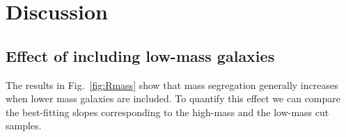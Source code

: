 \section{Discussion}
\label{sec:discussion_ms}

\subsection{Effect of including low-mass galaxies}

The results in Fig.~\ref{fig:Rmass} show that mass segregation
generally increases when lower mass galaxies are included.  To
quantify this effect we can compare the best-fitting slopes
corresponding to the high-mass and the low-mass cut samples.

%


